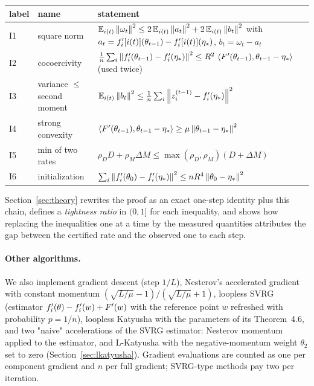 \begin{center}
\begin{tabular}{llp{8.2cm}}
\toprule
label & name & statement \\
\midrule
I1 & square norm & $\mathbb{E}_{i(t)}\left\|\omega_t\right\|^2 \le 2\,\mathbb{E}_{i(t)}\left\|a_t\right\|^2 + 2\,\mathbb{E}_{i(t)}\left\|b_t\right\|^2$ with $a_t = f'_i[i(t)](\theta_{t-1}) - f'_i[i(t)](\eta_\ast)$, $b_t = \omega_t - a_t$ \\
I2 & cocoercivity & $\frac1n\sum_i \left\|f'_i(\theta_{t-1}) - f'_i(\eta_\ast)\right\|^2 \le R^2\,\left\langle F'(\theta_{t-1}), \theta_{t-1} - \eta_\ast \right\rangle$ (used twice) \\
I3 & variance $\le$ second moment & $\mathbb{E}_{i(t)}\left\|b_t\right\|^2 \le \frac1n \sum_i \left\|z_i^{(t-1)} - f'_i(\eta_\ast)\right\|^2$ \\
I4 & strong convexity & $\left\langle F'(\theta_{t-1}), \theta_{t-1} - \eta_\ast \right\rangle \ge \mu\left\|\theta_{t-1} - \eta_\ast\right\|^2$ \\
I5 & min of two rates & $\rho_D D + \rho_M \Delta M \le \max(\rho_D, \rho_M)(D + \Delta M)$ \\
I6 & initialization & $\sum_i \left\|f'_i(\theta_0) - f'_i(\eta_\ast)\right\|^2 \le nR^4\left\|\theta_0 - \eta_\ast\right\|^2$ \\
\bottomrule
\end{tabular}
\end{center}
Section~\ref{sec:theory} rewrites the proof as an exact one-step identity plus this chain, defines a
\emph{tightness ratio} in $(0,1]$ for each inequality, and shows how replacing the inequalities one at a time by
the measured quantities attributes the gap between the certified rate and the observed one to each step.

\paragraph{Other algorithms.}
We also implement gradient descent (step $1/L$), Nesterov's accelerated gradient with constant momentum
$(\sqrt{L/\mu}-1)/(\sqrt{L/\mu}+1)$, loopless SVRG \cite{hofmann2015variance,kovalev2020dont} (estimator
$f'_i(\theta) - f'_i(w) + F'(w)$ with the reference point $w$ refreshed with probability $p = 1/n$), loopless
Katyusha \cite{kovalev2020dont} with the parameters of its Theorem~4.6, and two "naive" accelerations of the
SVRG estimator: Nesterov momentum applied to the estimator, and L-Katyusha with the negative-momentum weight
$\theta_2$ set to zero (Section~\ref{sec:lkatyusha}). Gradient evaluations are counted as one per component
gradient and $n$ per full gradient; SVRG-type methods pay two per iteration.

